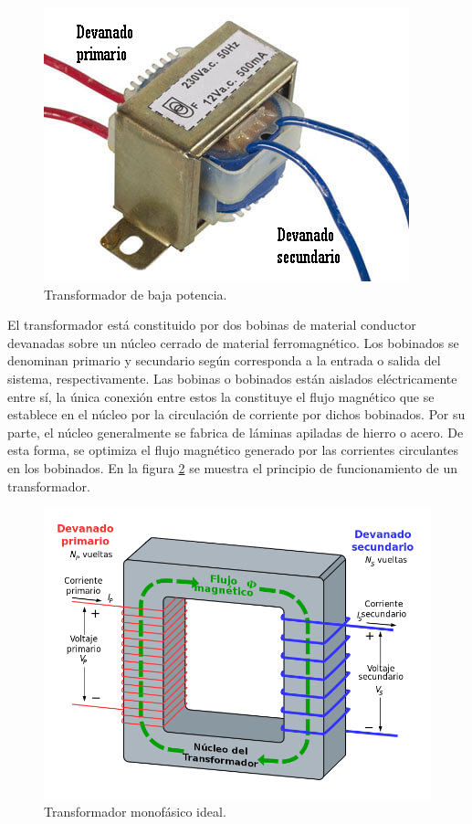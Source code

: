 \begin{figure}[h]
	\centering
	\includegraphics[scale=.5]{./Figures/transformador.jpg}
	\caption{Transformador de baja potencia\protect\footnotemark.}
	\label{fig:figTransformador}
\end{figure}


El transformador está constituido por dos bobinas de material conductor devanadas sobre un núcleo cerrado de material ferromagnético. Los bobinados se denominan primario y secundario según corresponda a la entrada o salida del sistema, respectivamente. Las bobinas o bobinados están aislados eléctricamente entre sí, la única conexión entre estos la constituye el flujo magnético que se establece en el núcleo por la circulación de corriente por dichos bobinados. Por su parte, el núcleo generalmente se fabrica de láminas apiladas de hierro o acero. De esta forma, se optimiza el flujo magnético generado por las corrientes circulantes en los bobinados. En la figura \ref{fig:figTransformador2} se muestra el principio de funcionamiento de un transformador.

\begin{figure}[htpb]
	\centering
	\includegraphics[scale=.3]{./Figures/transformador_2.png}
	\caption{Transformador monofásico ideal\protect\footnotemark.}
	\label{fig:figTransformador2}
\end{figure}

